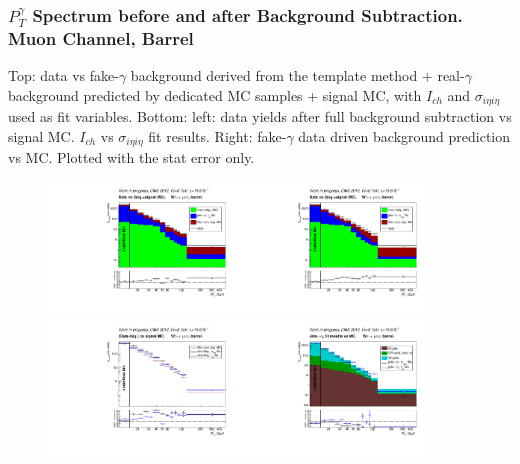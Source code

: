 \begin{frame}\frametitle{\footnotesize{$P_T^{\gamma}$ Spectrum before and after Background Subtraction. Muon Channel, Barrel}}
  \tiny{Top: data vs fake-$\gamma$ background derived from the template method + real-$\gamma$ background predicted by dedicated MC samples + signal MC, with $I_{ch}$ and $\sigma_{i\eta{i}\eta}$ used as fit variables. Bottom: left: data yields after full background subtraction vs signal MC. $I_{ch}$ vs $\sigma_{i\eta{i}\eta}$ fit results. Right: fake-$\gamma$ data driven background prediction vs MC. Plotted with the stat error only.}
  \begin{figure}[htb]
    \begin{center}
       \includegraphics[width=0.45\textwidth]{../figs/figs_v11/MUON_WGamma/PrepareYields/c_DATAvsBkgPlusSigMCc_MUON_WGamma_TEMPL_CHISO_UNblind__Barrel__phoEt.pdf}\includegraphics[width=0.45\textwidth]{../figs/figs_v11/MUON_WGamma/PrepareYields/c_DATAvsBkgPlusSigMCc_MUON_WGamma_TEMPL_SIHIH_UNblind__Barrel__phoEt.pdf}\\
       \includegraphics[width=0.45\textwidth]{../figs/figs_v11/MUON_WGamma/PrepareYields/c_BkgSubtrDATAvsSIGMC_c_MUON_WGamma__UNblind__Barrel__phoEt.pdf}\includegraphics[width=0.45\textwidth]{../figs/figs_v11/MUON_WGamma/PrepareYields/c_FakeDDvsMC_c_MUON_WGamma__UNblind__Barrel__phoEt.pdf}\\

\end{center}
\end{figure}
\end{frame}
